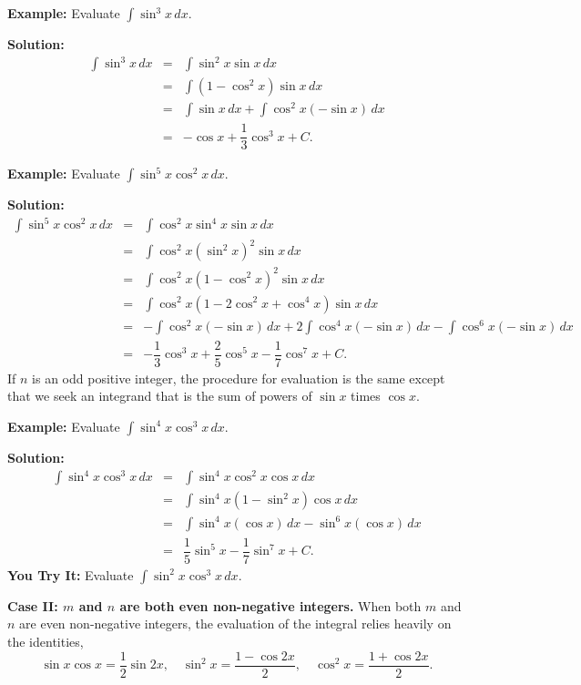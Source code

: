 \documentclass[titlepage,a4paper,12pt]{report}
\begin{document}
\noindent \textbf{Example:} Evaluate $\displaystyle \int \sin ^3 x\, dx$.

\noindent \textbf{Solution:} 
\begin{eqnarray*}
\int \sin ^3 x\, dx &=&\int \sin ^2 x\sin x \, dx\\
&=& \int (1-\cos ^2 x)\sin x \, dx \\
&=&\int \sin x\, dx +\int \cos ^2 x (-\sin x)\, dx\\
&=& -\cos x +\dfrac{1}{3}\cos ^3 x +C.
\end{eqnarray*}


\noindent \textbf{Example:} Evaluate $\displaystyle \int \sin ^5 x \cos ^2x\, dx$.

\noindent \textbf{Solution:}
\begin{eqnarray*}
\int \sin ^5 x \cos ^2 x\, dx &=& \int \cos ^2 x\sin ^4 x \sin x\, dx\\
&=& \int \cos ^2 x (\sin ^2 x)^2 \sin x \, dx\\
&=& \int \cos ^2 x (1-\cos ^2 x)^2 \sin x \, dx\\
&=& \int \cos ^2 x (1-2\cos ^2 x+\cos ^4 x)\sin x \, dx\\
&=& -\int \cos ^2 x (-\sin x)\, dx +2\int \cos ^4 x (-\sin x)\, dx -\int \cos ^6 x(-\sin x)\, dx \\
&=&-\dfrac{1}{3}\cos ^3 x +\dfrac{2}{5}\cos ^5 x-\dfrac{1}{7}\cos ^7 x +C.
\end{eqnarray*}
If $n$ is an odd positive integer, the procedure for evaluation is the same except that we seek an integrand that is the sum of powers of $\sin x$ times $\cos x$.

\noindent \textbf{Example:} Evaluate $\displaystyle \int \sin ^4 x \cos ^3 x\, dx$.

\noindent \textbf{Solution:} 
\begin{eqnarray*}
\int \sin ^4 x \cos ^3 x\, dx &=& \int \sin ^4 x \cos ^2 x \cos x\, dx\\
&=& \int \sin ^4 x (1-\sin ^2 x)\cos x\, dx\\
&=& \int \sin ^4 x (\cos x)\, dx -\sin ^6 x (\cos x)\, dx\\
&=&\dfrac{1}{5}\sin ^5 x -\dfrac{1}{7}\sin ^7 x +C.
\end{eqnarray*}
 \noindent \textbf{You Try It:} Evaluate $\displaystyle \int \sin ^2 x \cos ^3 x \, dx$.
 
 \noindent \textbf{Case II: $m$ and $n$ are both even non-negative integers.} When both $m$ and $n$ are even non-negative integers, the evaluation of the integral relies heavily on the identities, 
 \begin{equation*}
 \sin x \cos x =\dfrac{1}{2}\sin 2x, \quad \sin ^2 x =\dfrac{1-\cos 2x}{2}, \quad \cos ^2 x =\dfrac{1+\cos 2x}{2}.
\end{equation*}
\end{document}
